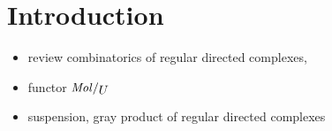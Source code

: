 \section*{Introduction}

\begin{itemize}
    \item review combinatorics of regular directed complexes, 
    \item functor \( \molecin{U} \)
    \item suspension, gray product of regular directed complexes
\end{itemize}
